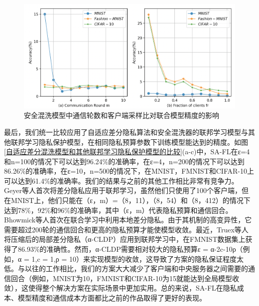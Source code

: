\begin{figure}[!hbt]
\centering
  	\includegraphics[scale=0.4]{fig2/C5/SA-FL2}%
	\caption{安全混洗模型中通信轮数和客户端采样比对联合模型精度的影响}
  	\label{fig:安全混洗模型中通信轮数和客户端采样比对联合模型精度的影响} 
\end{figure}

最后，我们统一比较应用了自适应差分隐私算法和安全混洗器的联邦学习模型与其他联邦学习隐私保护模型，在相同隐私预算参数下训练模型能达到的精度。如图\ref{自适应差分混洗模型和其他联邦学习隐私保护模型的比较}(a-c)中，SA-FL在ε=4和n=100的情况下可以达到96.24$\%$的准确率，在ε=4，n=200的情况下可以达到86.26$\%$的准确率，在ε=10，n=500的情况下，在MNIST，FMNIST和CIFAR-10上可以达到61.4$\%$的准确率。我们的结果与之前的其他工作相比非常有竞争力。Geyer等人首次将差分隐私应用于联邦学习，虽然他们只使用了100个客户端，但在MNIST上，他们只能在（ε，m）=（8，11），（8，54）和（8，412）的情况下达到78$\%$，92$\%$和96$\%$的准确率，其中（ε，m）代表隐私预算和通信回合。Bhowmick等人首次在联合学习中利用本地差分隐私。由于其机制的高变异性，它需要超过200轮的通信回合和更高的隐私预算才能使模型收敛。最近，Truex等人将压缩后的局部差分隐私（α-CLDP）应用到联邦学习中，在FMNIST数据集上获得了86.93$\%$的准确性。然而，α-CLDP需要相对较大的隐私预算ε = α-2c-10ρ（例如，α = 1,c = 1,ρ = 10）来实现模型的收敛，这导致了方案的隐私保证程度太低。与以往的工作相比，我们的方案大大减少了客户端和中央服务器之间需要的通信回合（例如，MNIST为10，FMNIST和CIFAR-10为15就能达到全局模型收敛），这使得整个解决方案在实际场景中更加实用。总的来说，SA-FL在隐私成本、模型精度和通信成本方面都比之前的作品取得了更好的表现。

